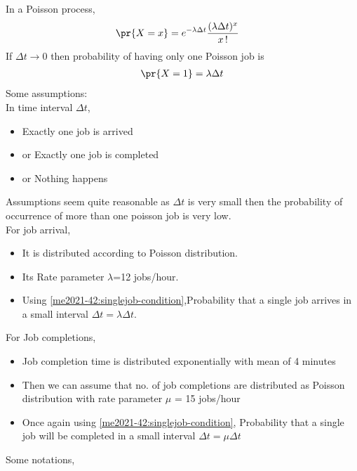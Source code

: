 In a Poisson process,
 \begin{align}
          \pr{X=x}&= e^{-\lambda \Delta t} \frac{(\lambda \Delta t)^{x}}{x\,!}
 \end{align}
If $\Delta t \rightarrow 0$ then probability of having only one Poisson job is  
  \begin{align}
         \pr{X=1}=\lambda \Delta t \label{me2021-42:singlejob-condition}
 \end{align}
 Some assumptions:\\
 In time interval $\Delta t$,
 \begin{itemize}
     \item Exactly one job is arrived  
     \item or Exactly one job is completed
     \item or Nothing happens
 \end{itemize}
Assumptions seem quite reasonable as $\Delta t$ is very small then the probability of occurrence of more than one poisson job is very low.\\
 For job arrival,
 \begin{itemize}
 \item It is distributed according to Poisson distribution.
     \item Its
 Rate parameter $\lambda $=12 jobs/hour.
 \item Using \eqref{me2021-42:singlejob-condition},Probability that a single job arrives in a small interval $\Delta t=\lambda\Delta t$.
 \end{itemize}
 For Job completions,
 \begin{itemize}
     \item  Job completion time is distributed exponentially with mean of 4 minutes 
     \item Then we can assume that no. of job completions are distributed as Poisson distribution with rate parameter $\mu$ = 15 jobs/hour
     \item Once again using \eqref{me2021-42:singlejob-condition},
 Probability that a single job will be completed in a small interval $\Delta t=\mu \Delta t$
 \end{itemize}
 Some notations,
